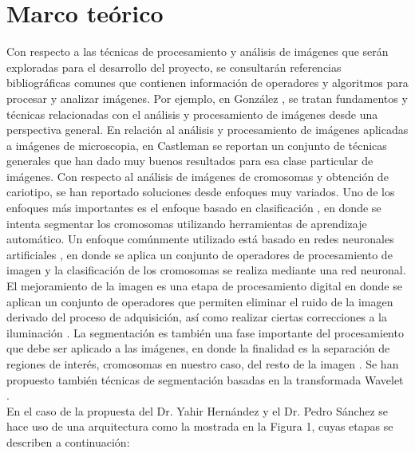 \documentclass[12pt,letterpaper,titlepage]{article}
\begin{document}
\section{Marco teórico}\label{marco}
Con respecto a las técnicas de procesamiento y análisis de imágenes que serán exploradas para el desarrollo del proyecto, se consultarán referencias bibliográficas comunes que contienen información de operadores y algoritmos para procesar y analizar imágenes. Por ejemplo, en  González \cite{1077}, se tratan fundamentos y técnicas relacionadas con el análisis y procesamiento de imágenes desde una perspectiva general. En relación al análisis y procesamiento de imágenes aplicadas a imágenes de microscopia, en Castleman \cite{1022} se reportan un conjunto de técnicas generales que han dado muy buenos resultados para esa clase particular de imágenes. Con respecto al análisis de imágenes de cromosomas y obtención de cariotipo, se han reportado soluciones desde enfoques muy variados. Uno de los enfoques más importantes es el enfoque basado en clasificación \cite{113}, en donde se intenta segmentar los cromosomas utilizando herramientas de aprendizaje automático. Un enfoque comúnmente utilizado está basado en redes neuronales artificiales \cite{104} \cite{111}, en donde se aplica un conjunto de operadores de procesamiento de imagen y la clasificación de los cromosomas se  realiza mediante una red neuronal. El mejoramiento de la imagen es una etapa de procesamiento digital en donde se aplican un conjunto de operadores que permiten eliminar el ruido de la imagen derivado del proceso de adquisición, así como realizar ciertas correcciones a la iluminación \cite{114}. La segmentación es también una fase importante del procesamiento que debe ser aplicado a las imágenes, en donde la finalidad es la separación de regiones de interés, cromosomas en nuestro caso, del resto de la imagen \cite{106} \cite{109} \cite{103} \cite{117} \cite{112}. Se han propuesto también técnicas de segmentación basadas en la transformada Wavelet \cite{116} \cite{115}. \\

En el caso de la propuesta del Dr. Yahir Hernández y el Dr. Pedro Sánchez se hace uso de una arquitectura como la mostrada en la Figura 1, cuyas etapas se describen a continuación:\\\\
\end{document}
